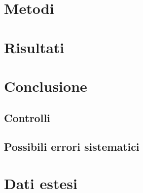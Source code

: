 \documentclass[italian, a4paper, 10pt, twocolumn]{../../style/lab_unige}
\begin{document}
    \section{Metodi}
    \label{section:methods}


    \section{Risultati}
    \label{section:results}

    \section{Conclusione}
    \label{section:conclusion}

    \subsection{Controlli}

    \subsection{Possibili errori sistematici}

    \appendix

    \setcounter{table}{0}
    \renewcommand{\thetable}{A\arabic{table}}

    \section{Dati estesi}
    
\end{document}

